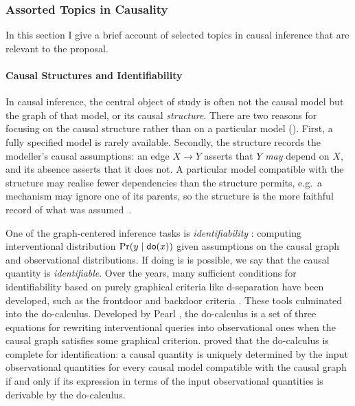 \documentclass[11pt,a4paper]{article}
\begin{document}
\subsubsection{Assorted Topics in Causality}\label{sec:assorted}
In this section I give a brief account of selected topics in causal inference that are relevant to the proposal. 

\paragraph{Causal Structures and Identifiability} In causal inference, the central object of study is often not the causal model but the graph of that model, or its causal \emph{structure}. There are two reasons for focusing on the causal structure rather than on a particular model (). First, a fully specified model is rarely available. Secondly, the structure records the modeller's causal assumptions: an edge $X \to Y$ asserts that $Y$ \emph{may} depend on $X$, and its absence asserts that it does not. A particular model compatible with the structure may realise fewer dependencies than the structure permits, e.g.\ a mechanism may ignore one of its parents, so the structure is the more faithful record of what was assumed~\cite{spirtes2000causation,barrett2020quantumcausalmodels}. 

One of the graph-centered inference tasks is \emph{identifiability} : computing interventional distribution $\Pr(y \mid \mathsf{do}(x))$ given assumptions on the causal graph and observational distributions. If doing is is possible, we say that the causal quantity is \emph{identifiable}. Over the years, many sufficient conditions for identifiability based on purely graphical criteria like d-separation have been developed, such as the frontdoor and backdoor criteria . These tools culminated into the do-calculus. Developed by Pearl , the do-calculus is a set of three equations for rewriting interventional queries into observational ones when the causal graph satisfies some graphical criterion.  proved that the do-calculus is complete for identification: a causal quantity is uniquely determined by the input observational quantities for every causal model compatible with the causal graph if and only if its expression in terms of the input observational quantities is derivable by the do-calculus. 
\end{document}
